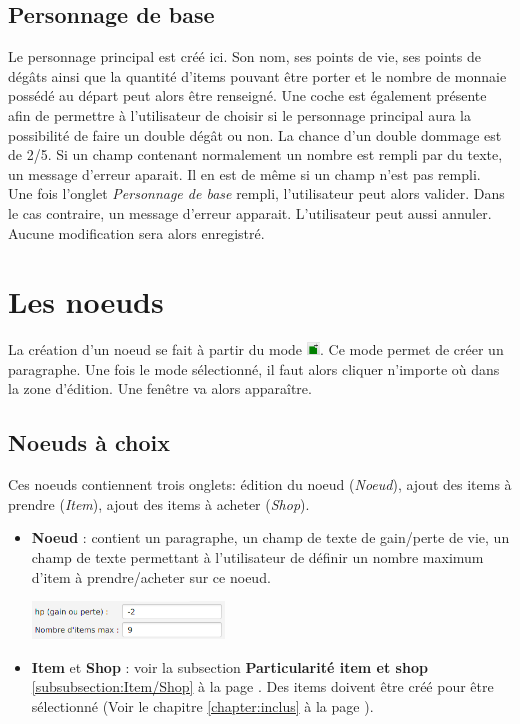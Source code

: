 		\subsection{Personnage de base}
			Le personnage principal est créé ici. Son nom, ses points de vie, ses points de dégâts ainsi que la quantité d'items pouvant être porter et le nombre de monnaie possédé au départ peut alors être renseigné. Une coche est également présente afin de permettre à l'utilisateur de choisir si le personnage principal aura la possibilité de faire un double dégât ou non. La chance d'un double dommage est de 2/5.
			Si un champ contenant normalement un nombre est rempli par du texte, un message d'erreur aparait. Il en est de même si un champ n'est pas rempli.\\
		\newline
		Une fois l'onglet \textit{Personnage de base} rempli, l'utilisateur peut alors valider. Dans le cas contraire, un message d'erreur apparait. L'utilisateur peut aussi annuler. Aucune modification sera alors enregistré.

	\section{Les noeuds}
		La création d'un noeud se fait à partir du mode \includegraphics[height=10pt]{img/modeEdition.png}. Ce mode permet de créer un paragraphe. Une fois le mode sélectionné, il faut alors cliquer n'importe où dans la zone d'édition. Une fenêtre va alors apparaître.

		\subsection{Noeuds à choix}
			Ces noeuds contiennent trois onglets: édition du noeud (\textit{Noeud}), ajout des items à prendre (\textit{Item}), ajout des items à acheter (\textit{Shop}).

			\begin{itemize}
				\item \textbf{Noeud} : contient un paragraphe, un champ de texte de gain/perte de vie, un champ de texte permettant à l'utilisateur de définir un nombre maximum d'item à prendre/acheter sur ce noeud.
				\begin{center}
					\includegraphics[height=1cm]{img/noeudBasic.png}
				\end{center}

				\item \textbf{Item} et \textbf{Shop} : voir la subsection \textbf{Particularité item et shop} \ref{subsubsection:Item/Shop} à la page \pageref{subsubsection:Item/Shop}. Des items doivent être créé pour être sélectionné (Voir le chapitre \ref{chapter:inclus} à la page \pageref{chapter:inclus}).
			\end{itemize}

